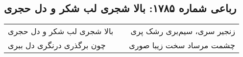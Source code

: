 \begin{center}
\section*{رباعی شماره ۱۷۸۵: بالا شجری لب شکر و دل حجری}
\label{sec:1785}
\begin{longtable}{l p{0.5cm} r}
بالا شجری لب شکر و دل حجری
&&
زنجیر سری، سیم‌بری رشک پری
\\
چون برگذری درنگری دل ببری
&&
چشمت مرساد سخت زیبا صوری
\\
\end{longtable}
\end{center}
